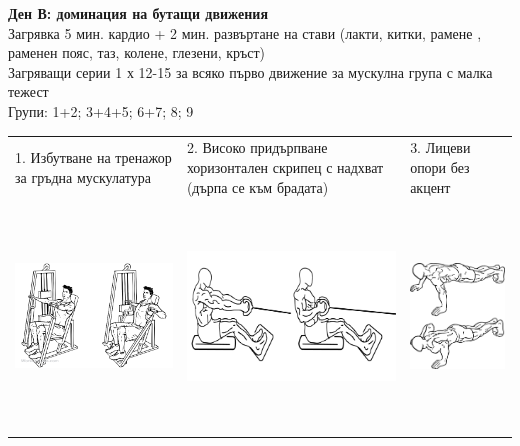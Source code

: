 \documentclass{article}
\begin{document}
\newpage
\textbf{Ден В: доминация на бутащи движения}\\
Загрявка 5 мин. кардио + 2 мин. развъртане на стави (лакти, китки, рамене ,
раменен пояс, таз, колене, глезени, кръст)\\
Загряващи серии 1 х 12-15 за всяко първо движение за мускулна група с малка
тежест\\
Групи: 1+2; 3+4+5; 6+7; 8; 9\\ 
\begin{tabular}{ | m{5cm} | m{5cm} | m{5cm} | }
\hline
1. Избутване на тренажор за гръдна мускулатура & 
2. Високо придърпване хоризонтален скрипец с надхват (дърпа се към брадата)& 
3. Лицеви опори без акцент \\ 
\begin{minipage}{5cm} \includegraphics[width=\linewidth, height=60mm]{day_B_ex_1_Hammer_Strength_Machine_Chest_Press_M_WorkoutLabs.png} \end{minipage}&
\begin{minipage}{5cm} \includegraphics[width=\linewidth, height=60mm]{day_B_ex_2_nab_seated_cable_row.jpg} \end{minipage}& 
\begin{minipage}{5cm} \includegraphics[width=\linewidth, height=60mm]{day_B_ex_3_push-up.png} \end{minipage}\\ 

\end{tabular}
\end{document}
